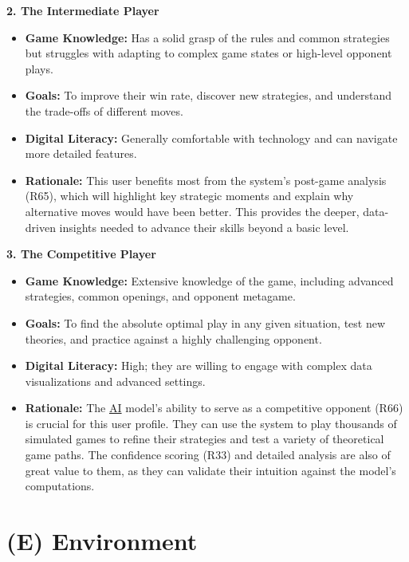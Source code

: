 \documentclass{article}
\newcommand{\AI}{\href{https://en.wikipedia.org/wiki/Artificial_intelligence}{AI}}
\begin{document}
\noindent\textbf{2. The Intermediate Player}
\begin{itemize}
    \item \textbf{Game Knowledge:} Has a solid grasp of the rules and common strategies but struggles with adapting to complex game states or high-level opponent plays.
    \item \textbf{Goals:} To improve their win rate, discover new strategies, and understand the trade-offs of different moves.
    \item \textbf{Digital Literacy:} Generally comfortable with technology and can navigate more detailed features.
    \item \textbf{Rationale:} This user benefits most from the system's post-game analysis (R65), which will highlight key strategic moments and explain why alternative moves would have been better. This provides the deeper, data-driven insights needed to advance their skills beyond a basic level.
\end{itemize}

\noindent\textbf{3. The Competitive Player}
\begin{itemize}
    \item \textbf{Game Knowledge:} Extensive knowledge of the game, including advanced strategies, common openings, and opponent metagame.
    \item \textbf{Goals:} To find the absolute optimal play in any given situation, test new theories, and practice against a highly challenging opponent.
    \item \textbf{Digital Literacy:} High; they are willing to engage with complex data visualizations and advanced settings.
    \item \textbf{Rationale:} The \AI{} model's ability to serve as a competitive opponent (R66) is crucial for this user profile. They can use the system to play thousands of simulated games to refine their strategies and test a variety of theoretical game paths. The confidence scoring (R33) and detailed analysis are also of great value to them, as they can validate their intuition against the model's computations.
\end{itemize}


\newpage{}



\section*{(E) Environment}\label{sec:srs-environment}
\renewcommand{\thesubsection}{E.\arabic{subsection}}
\setcounter{subsection}{0}
\end{document}
